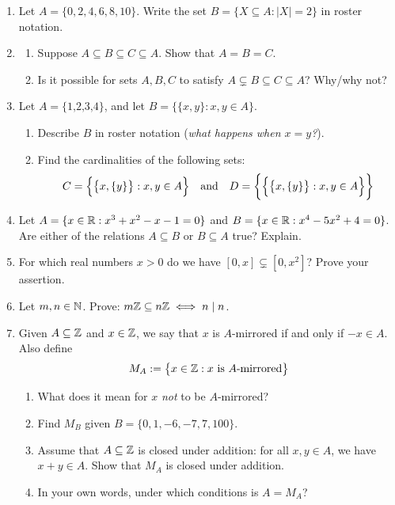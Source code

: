 \begin{exercises}{}{}
\begin{enumerate}
	  \item Let $A=\{0,2,4,6,8,10\}$. Write the set $B=\{X\subseteq A:|X|=2\}$ in roster notation.
	  
	    
	  \item\begin{enumerate}
	    \item Suppose $A\subseteq B\subseteq C\subseteq A$. Show that $A=B=C$.
	    \item Is it possible for sets $A,B,C$ to satisfy $A\subsetneq B\subseteq C\subseteq A$? Why/why not?
	  \end{enumerate}

	
		\item Let $A=\{\text{1,2,3,4}\}$, and let $B =\bigl\{\{x,y\}:x,y\in A\bigr\}$.
		\begin{enumerate}
	  	\item Describe $B$ in roster notation (\emph{what happens when $x=y$?}).
			\item Find the cardinalities of the following sets:
			\[
				C=\Bigl\{\bigl\{x,\{y\}\bigr\}:x,y\in A\Bigr\}
				\quad\text{and}\quad
				D=\biggl\{\Bigl\{\bigl\{x,\{y\}\bigr\}:x,y\in A\Bigr\}\biggr\}
			\]
		\end{enumerate}
  
  
  	\item Let $A=\{x\in\mathbb{R}:x^3+x^2-x-1=0\}$ and $B=\{x\in\mathbb{R}:x^4-5x^2+4=0\}$. Are either of the relations $A\subseteq B$ or $B\subseteq A$ true? Explain.
  
  
  	\item For which real numbers $x>0$ do we have $[0,x]\subsetneq[0,x^2]$? Prove your assertion.
  
  
  	\item Let $m,n\in\mathbb{N}$. Prove: $m\mathbb{Z}\subseteq n\mathbb{Z}\iff n\mid n$.

  
  	\item\label{ex:mirrored} Given $A\subseteq\mathbb{Z}$ and $x\in\mathbb{Z}$, we say that $x$ is $A$-mirrored if and only if $-x\in A$. Also define
  	\[
			M_A:=\bigl\{x\in\mathbb{Z}: x\text{ is $A$-mirrored}\bigr\}
		\]
		\begin{enumerate}
	  	\item What does it mean for $x$ \emph{not} to be $A$-mirrored?
	  	\item Find $M_B$ given $B=\{0,1,-6,-7,7,100\}$.
	  	\item Assume that $A \subseteq\mathbb{Z}$ is closed under addition: for all $x,y\in A$, we have $x+y\in A$. Show that $M_A$ is closed under addition.
	  	\item In your own words, under which conditions is $A=M_A$?
		\end{enumerate}


\end{enumerate}
\end{exercises}
